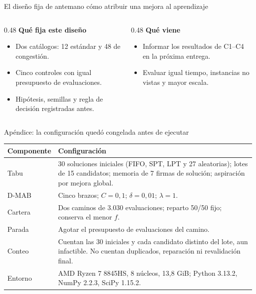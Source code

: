 \documentclass[aspectratio=169,11pt]{beamer}
\begin{document}
\begin{frame}{El diseño fija de antemano cómo atribuir una mejora al aprendizaje}
  \begin{columns}[t,onlytextwidth]
    \begin{column}{0.48\textwidth}
      {\bfseries\color{azul} Qué fija este diseño}
      \begin{itemize}
        \item Dos catálogos: 12 estándar y 48 de congestión.
        \item Cinco controles con igual presupuesto de evaluaciones.
        \item Hipótesis, semillas y regla de decisión registradas antes.
      \end{itemize}
    \end{column}
    \begin{column}{0.48\textwidth}
      {\bfseries\color{azul} Qué viene}
      \begin{itemize}
        \item Informar los resultados de C1--C4 en la próxima entrega.
        \item Evaluar igual tiempo, instancias no vistas y mayor escala.
      \end{itemize}
    \end{column}
  \end{columns}
\end{frame}

\appendix

\begin{frame}{Apéndice: la configuración quedó congelada antes de ejecutar}
  \centering\footnotesize
  \begin{tabular}{@{}p{}p{}@{}}
    \toprule
    Componente & Configuración\\
    \midrule
    Tabu & 30 soluciones iniciales (FIFO, SPT, LPT y 27 aleatorias); lotes de 15 candidatos; memoria de 7 firmas de solución; aspiración por mejora global.\\
    D-MAB & Cinco brazos; $C=0{,}1$; $\delta=0{,}01$; $\lambda=1$.\\
    Cartera & Dos caminos de 3.030 evaluaciones; reparto 50/50 fijo; conserva el menor $f$.\\
    Parada & Agotar el presupuesto de evaluaciones del camino.\\
    Conteo & Cuentan las 30 iniciales y cada candidato distinto del lote, aun infactible. No cuentan duplicados, reparación ni revalidación final.\\
    Entorno & AMD Ryzen 7 8845HS, 8 núcleos, 13,8 GiB; Python 3.13.2, NumPy 2.2.3, SciPy 1.15.2.\\
    \bottomrule
  \end{tabular}
\end{frame}
\end{document}
